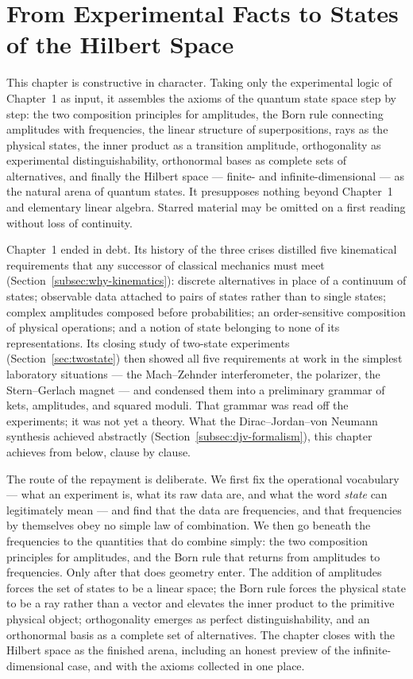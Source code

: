 \chapter{From Experimental Facts to States of the Hilbert Space}

\begin{note}
    This chapter is constructive in character. Taking only the experimental logic of Chapter~1 as input, it assembles the axioms of the quantum state space step by step: the two composition principles for amplitudes, the Born rule connecting amplitudes with frequencies, the linear structure of superpositions, rays as the physical states, the inner product as a transition amplitude, orthogonality as experimental distinguishability, orthonormal bases as complete sets of alternatives, and finally the Hilbert space --- finite- and infinite-dimensional --- as the natural arena of quantum states. It presupposes nothing beyond Chapter~1 and elementary linear algebra. Starred material may be omitted on a first reading without loss of continuity.
\end{note}

Chapter~1 ended in debt. Its history of the three crises distilled five kinematical requirements that any successor of classical mechanics must meet (Section~\ref{subsec:why-kinematics}): discrete alternatives in place of a continuum of states; observable data attached to pairs of states rather than to single states; complex amplitudes composed before probabilities; an order-sensitive composition of physical operations; and a notion of state belonging to none of its representations. Its closing study of two-state experiments (Section~\ref{sec:twostate}) then showed all five requirements at work in the simplest laboratory situations --- the Mach--Zehnder interferometer, the polarizer, the Stern--Gerlach magnet --- and condensed them into a preliminary grammar of kets, amplitudes, and squared moduli. That grammar was read off the experiments; it was not yet a theory. What the Dirac--Jordan--von Neumann synthesis achieved abstractly (Section~\ref{subsec:djv-formalism}), this chapter achieves from below, clause by clause.

The route of the repayment is deliberate. We first fix the operational vocabulary --- what an experiment is, what its raw data are, and what the word \emph{state} can legitimately mean --- and find that the data are frequencies, and that frequencies by themselves obey no simple law of combination. We then go beneath the frequencies to the quantities that do combine simply: the two composition principles for amplitudes, and the Born rule that returns from amplitudes to frequencies. Only after that does geometry enter. The addition of amplitudes forces the set of states to be a linear space; the Born rule forces the physical state to be a ray rather than a vector and elevates the inner product to the primitive physical object; orthogonality emerges as perfect distinguishability, and an orthonormal basis as a complete set of alternatives. The chapter closes with the Hilbert space as the finished arena, including an honest preview of the infinite-dimensional case, and with the axioms collected in one place.

